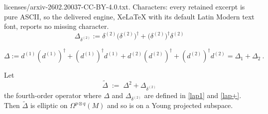 \documentclass[10pt,a4paper]{amsart}
\begin{document}
licenses/arxiv-2602.20037-CC-BY-4.0.txt. Characters: every retained excerpt is pure ASCII, so the delivered engine, XeLaTeX with its default Latin Modern text font, reports no missing character.
\begin{equation}
\Delta_{\delta^{(2)}}:=\delta^{(2)}\big(\delta^{(2)}\big)^{\dagger}+\big(\delta^{(2)}\big)^{\dagger}\delta^{(2)}
\label{lap+}
\end{equation}

\begin{equation}
\Delta:= d^{(1)}(d^{(1)})^{\dagger}+(d^{(1)})^{\dagger}d^{(1)}+d^{(2)}(d^{(2)})^{\dagger}+(d^{(2)})^{\dagger}d^{(2)}=\Delta_1 + \Delta_2\ .
\label{lap1}
\end{equation}

\begin{Proposition}\label{prop:ellipticity-Delta-tilde}
Let
\begin{equation*}\label{eq:Delta-tilde}
\widetilde{\Delta}\;:=\;\Delta^{2}+\Delta_{\delta^{(2)}}
\end{equation*}
the fourth-order operator where $\Delta$ and $\Delta_{\delta^{(2)}}$ are defined in \eqref{lap1} and \eqref{lap+}. Then $\widetilde{\Delta}$ is elliptic on $\Omega^{p\otimes q}(M)$ and so is on a Young projected subspace.
\end{Proposition}
\end{document}
